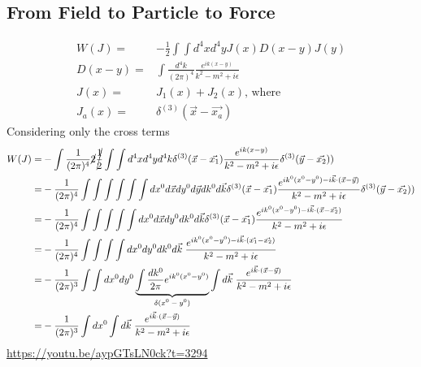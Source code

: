 \documentclass[]{article}
\begin{document}
\subsection{From Field to Particle to Force}
\begin{align*}
	W(J) =& - \frac{1}{2} \int \int d^4x d^4y J(x) D(x-y) J(y)\\
	D(x-y) =& \int \frac{d^4k}{(2\pi)^4} \frac{e^{ik(x-y)}}{k^2-m^2+i\epsilon}\\
	J(x) =& J_1(x) + J_2(x) \text{, where}\\
	J_{a}(x) =&\delta^{(3)}(\vec{x}-\vec{x_a}) 
\end{align*}
Considering only the cross terms
\begin{align*}
	W(J) =& - \int \frac{1}{(2\pi)^4} \cancel{2} \cancel{\frac{1}{2}} \int \int d^4x d^4y d^4k \delta^{(3)}(\vec{x}-\vec{x_1})   \frac{e^{ik(x-y)}}{k^2-m^2+i\epsilon} \delta^{(3)}(\vec{y}-\vec{x_2}))\\
	=& - \frac{1}{(2\pi)^4} \int \int \int \int \int \int dx^0 d\vec{x} dy^0 d\vec{y} dk^0 d\vec{k}  \delta^{(3)}(\vec{x}-\vec{x_1})   \frac{e^{ik^0(x^0-y^0)-i\vec{k} \cdot (\vec{x}-\vec{y})}}{k^2-m^2+i\epsilon} \delta^{(3)}(\vec{y}-\vec{x_2}))\\
	=& - \frac{1}{(2\pi)^4} \int \int \int \int \int dx^0 d\vec{x} dy^0 dk^0 d\vec{k}  \delta^{(3)}(\vec{x}-\vec{x_1})   \frac{e^{ik^0(x^0-y^0)-i\vec{k} \cdot (\vec{x}-\vec{x_2})}}{k^2-m^2+i\epsilon} \\
	=& - \frac{1}{(2\pi)^4} \int \int \int \int dx^0  dy^0 dk^0 d\vec{k} \;    \frac{e^{ik^0(x^0-y^0)-i\vec{k} \cdot (\vec{x_1}-\vec{x_2})}}{k^2-m^2+i\epsilon}\\
	=& - \frac{1}{(2\pi)^3} \int \int dx^0  dy^0 \underbrace{\int \frac{dk^0}{2\pi} e^{ik^0(x^0-y^0)}}_\text{$\delta(x^0-y^0)$} \int d\vec{k} \; \frac{e^{i\vec{k} \cdot (\vec{x}-\vec{y})}}{k^2-m^2+i\epsilon}\\
	=& - \frac{1}{(2\pi)^3} \int  dx^0  \int d\vec{k} \; \frac{e^{i\vec{k} \cdot (\vec{x}-\vec{y})}}{k^2-m^2+i\epsilon}
\end{align*}
\url{https://youtu.be/aypGTsLN0ck?t=3294}



\raggedright

\end{document}
